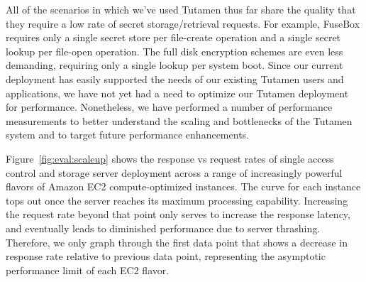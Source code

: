 All of the scenarios in which we've used Tutamen thus far share the
quality that they require a low rate of secret storage/retrieval
requests. For example, FuseBox requires only a single secret store per
file-create operation and a single secret lookup per file-open
operation. The full disk encryption schemes are even less demanding,
requiring only a single lookup per system boot. Since our current
deployment has easily supported the needs of our existing Tutamen
users and applications, we have not yet had a need to optimize our
Tutamen deployment for performance. Nonetheless, we have performed a
number of performance measurements to better understand the scaling
and bottlenecks of the Tutamen system and to target future performance
enhancements.

Figure~\ref{fig:eval:scaleup} shows the response vs request rates of
single access control and storage server deployment across a range of
increasingly powerful flavors of Amazon EC2 compute-optimized
instances. The curve for each instance tops out once the server
reaches its maximum processing capability. Increasing the request rate
beyond that point only serves to increase the response latency, and
eventually leads to diminished performance due to server
thrashing. Therefore, we only graph through the first data point that
shows a decrease in response rate relative to previous data point,
representing the asymptotic performance limit of each EC2 flavor.

